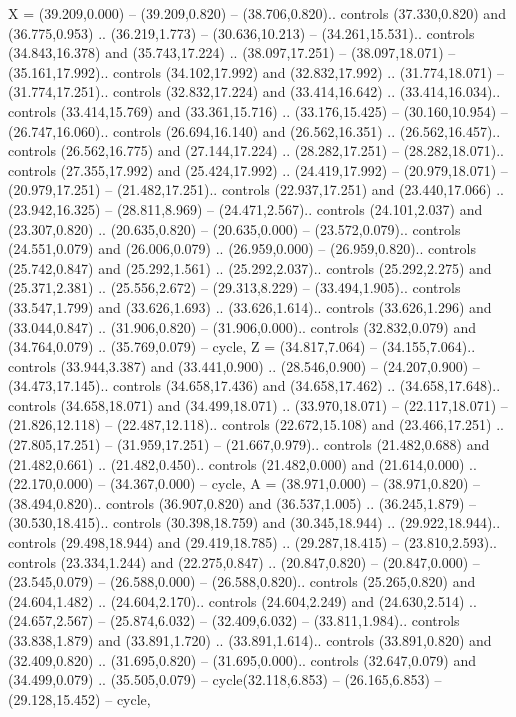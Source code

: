 {X} = {(39.209,0.000) -- (39.209,0.820) -- (38.706,0.820).. controls (37.330,0.820) and (36.775,0.953) .. (36.219,1.773) -- (30.636,10.213) -- (34.261,15.531).. controls (34.843,16.378) and (35.743,17.224) .. (38.097,17.251) -- (38.097,18.071) -- (35.161,17.992).. controls (34.102,17.992) and (32.832,17.992) .. (31.774,18.071) -- (31.774,17.251).. controls (32.832,17.224) and (33.414,16.642) .. (33.414,16.034).. controls (33.414,15.769) and (33.361,15.716) .. (33.176,15.425) -- (30.160,10.954) -- (26.747,16.060).. controls (26.694,16.140) and (26.562,16.351) .. (26.562,16.457).. controls (26.562,16.775) and (27.144,17.224) .. (28.282,17.251) -- (28.282,18.071).. controls (27.355,17.992) and (25.424,17.992) .. (24.419,17.992) -- (20.979,18.071) -- (20.979,17.251) -- (21.482,17.251).. controls (22.937,17.251) and (23.440,17.066) .. (23.942,16.325) -- (28.811,8.969) -- (24.471,2.567).. controls (24.101,2.037) and (23.307,0.820) .. (20.635,0.820) -- (20.635,0.000) -- (23.572,0.079).. controls (24.551,0.079) and (26.006,0.079) .. (26.959,0.000) -- (26.959,0.820).. controls (25.742,0.847) and (25.292,1.561) .. (25.292,2.037).. controls (25.292,2.275) and (25.371,2.381) .. (25.556,2.672) -- (29.313,8.229) -- (33.494,1.905).. controls (33.547,1.799) and (33.626,1.693) .. (33.626,1.614).. controls (33.626,1.296) and (33.044,0.847) .. (31.906,0.820) -- (31.906,0.000).. controls (32.832,0.079) and (34.764,0.079) .. (35.769,0.079) -- cycle},
{Z} = {(34.817,7.064) -- (34.155,7.064).. controls (33.944,3.387) and (33.441,0.900) .. (28.546,0.900) -- (24.207,0.900) -- (34.473,17.145).. controls (34.658,17.436) and (34.658,17.462) .. (34.658,17.648).. controls (34.658,18.071) and (34.499,18.071) .. (33.970,18.071) -- (22.117,18.071) -- (21.826,12.118) -- (22.487,12.118).. controls (22.672,15.108) and (23.466,17.251) .. (27.805,17.251) -- (31.959,17.251) -- (21.667,0.979).. controls (21.482,0.688) and (21.482,0.661) .. (21.482,0.450).. controls (21.482,0.000) and (21.614,0.000) .. (22.170,0.000) -- (34.367,0.000) -- cycle},
{A} = {(38.971,0.000) -- (38.971,0.820) -- (38.494,0.820).. controls (36.907,0.820) and (36.537,1.005) .. (36.245,1.879) -- (30.530,18.415).. controls (30.398,18.759) and (30.345,18.944) .. (29.922,18.944).. controls (29.498,18.944) and (29.419,18.785) .. (29.287,18.415) -- (23.810,2.593).. controls (23.334,1.244) and (22.275,0.847) .. (20.847,0.820) -- (20.847,0.000) -- (23.545,0.079) -- (26.588,0.000) -- (26.588,0.820).. controls (25.265,0.820) and (24.604,1.482) .. (24.604,2.170).. controls (24.604,2.249) and (24.630,2.514) .. (24.657,2.567) -- (25.874,6.032) -- (32.409,6.032) -- (33.811,1.984).. controls (33.838,1.879) and (33.891,1.720) .. (33.891,1.614).. controls (33.891,0.820) and (32.409,0.820) .. (31.695,0.820) -- (31.695,0.000).. controls (32.647,0.079) and (34.499,0.079) .. (35.505,0.079) -- cycle(32.118,6.853) -- (26.165,6.853) -- (29.128,15.452) -- cycle},
